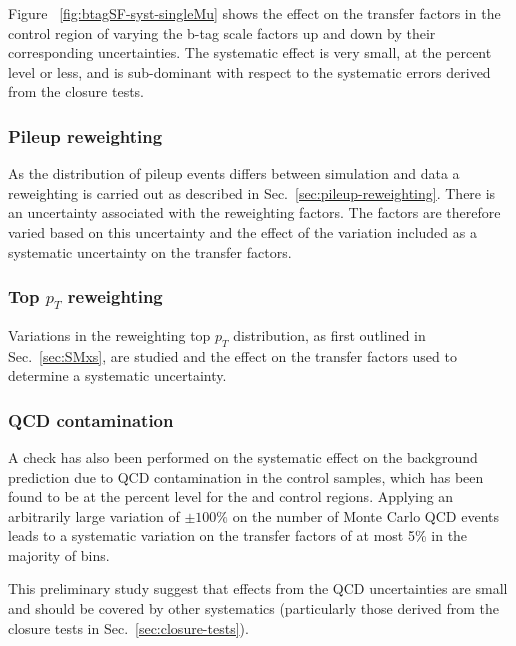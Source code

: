 Figure ~\ref{fig:btagSF-syst-singleMu} shows the effect on the transfer
factors in the \mj control region of varying the b-tag scale factors 
up and down by their corresponding uncertainties. The systematic
effect is very small, at the percent level or less, and is
sub-dominant with respect to the systematic errors derived from the 
closure tests.

\subsubsection{Pileup reweighting}

As the distribution of pileup events differs between simulation and
data a reweighting is carried out as described in
Sec.~\ref{sec:pileup-reweighting}. There is an uncertainty associated
with the reweighting factors. The factors are therefore varied based
on this uncertainty and the effect of the variation included as a
systematic uncertainty on the transfer factors.

\subsubsection{Top $p_T$ reweighting}

Variations in the reweighting top $p_{T}$ distribution, as first outlined in 
Sec.~\ref{sec:SMxs}, are studied and the effect on the transfer
factors used to determine a systematic uncertainty.

\subsubsection{QCD contamination}

A check has also been performed on the systematic effect on the
background prediction due to QCD contamination in the control samples,
which has been found to be at the percent level for the \mj and \gj
control regions. Applying an arbitrarily large variation of $\pm
100\%$ on the number of Monte Carlo QCD events leads to a systematic
variation on the transfer factors of at most 5\% in the majority of
bins.

This preliminary study suggest that effects from the QCD
uncertainties are small and should be covered by other systematics
(particularly those derived from the closure tests in
Sec.~\ref{sec:closure-tests}).



